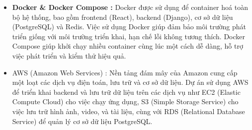 \documentclass{article}
\begin{document}
\begin{itemize}
\item
  \textbf{Docker \& Docker Compose :} Docker được sử dụng để container
  hoá toàn bộ hệ thống, bao gồm frontend (React), backend (Django), cơ
  sở dữ liệu (PostgreSQL) và Redis. Việc sử dụng Docker giúp đảm bảo môi
  trường phát triển giống với môi trường triển khai, hạn chế lỗi không
  tương thích. Docker Compose giúp khởi chạy nhiều container cùng lúc
  một cách dễ dàng, hỗ trợ việc phát triển và kiểm thử hiệu quả.
\item
  AWS (Amazon Web Services) : Nền tảng đám mây của Amazon cung cấp một
  loạt các dịch vụ điện toán, lưu trữ và cơ sở dữ liệu. Dự án sử dụng
  AWS để triển khai backend và lưu trữ dữ liệu trên các dịch vụ như EC2
  (Elastic Compute Cloud) cho việc chạy ứng dụng, S3 (Simple Storage
  Service) cho việc lưu trữ hình ảnh, video, và tài liệu, cùng với RDS
  (Relational Database Service) để quản lý cơ sở dữ liệu PostgreSQL.
\end{itemize}

\subsubsection{}\label{section-2}

\subsubsection{}\label{section-3}

\subsubsection{}\label{section-4}

\subsubsection{}\label{section-5}

\subsubsection{}\label{section-6}

\subsubsection{}\label{section-7}

\subsubsection{}\label{section-8}
\end{document}
